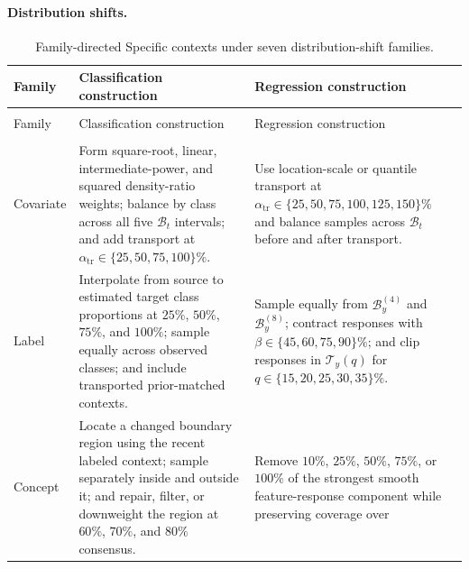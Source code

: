 \paragraph{Distribution shifts.}
\begingroup
  \footnotesize
  \setlength{\LTpre}{0.45\baselineskip}
  \setlength{\LTpost}{0.45\baselineskip}
  \begin{longtable}{@{}>{\raggedright\arraybackslash}p{}
                      >{\raggedright\arraybackslash}p{}
                      >{\raggedright\arraybackslash}p{}@{}}
    \caption{Family-directed Specific contexts under seven distribution-shift
    families.}
    \label{tab:specific-shift-contexts} \\
    \toprule
    Family & Classification construction & Regression construction \\
    \midrule
    \endfirsthead
    \multicolumn{3}{@{}l}{\tablename~\thetable\ (continued)} \\
    \toprule
    Family & Classification construction & Regression construction \\
    \midrule
    \endhead
    \midrule
    \multicolumn{3}{r@{}}{Continued on next page} \\
    \endfoot
    \bottomrule
    \endlastfoot
    Covariate
      & Form square-root, linear, intermediate-power, and squared density-ratio
        weights; balance by class across all five $\mathcal B_t$ intervals;
        and add transport at $\alpha_{\mathrm{tr}}\in\{25,50,75,100\}\%$.
      & Use location-scale or quantile transport at
        $\alpha_{\mathrm{tr}}\in\{25,50,75,100,125,150\}\%$ and balance samples across
        $\mathcal B_t$ before and after transport. \\
    Label
      & Interpolate from source to estimated target class proportions at
        $25\%$, $50\%$, $75\%$, and $100\%$; sample equally across observed
        classes; and include transported prior-matched contexts.
      & Sample equally from $\mathcal B_y^{(4)}$ and $\mathcal B_y^{(8)}$;
        contract responses with $\beta\in\{45,60,75,90\}\%$; and clip responses in
        $\mathcal T_y(q)$ for $q\in\{15,20,25,30,35\}\%$. \\
    Concept
      & Locate a changed boundary region using the recent labeled context;
        sample separately inside and outside it; and repair, filter, or
        downweight the region at $60\%$, $70\%$, and $80\%$ consensus.
      & Remove $10\%$, $25\%$, $50\%$, $75\%$, or $100\%$ of the strongest
        smooth feature-response component while preserving coverage over

\end{longtable}
